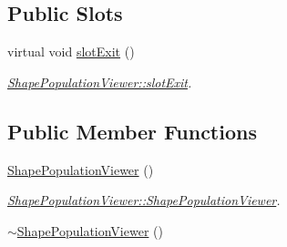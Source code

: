 \subsection*{Public Slots}
\begin{DoxyCompactItemize}
\item 
virtual void \hyperlink{class_shape_population_viewer_a4e328326e343af33bbb6f50368b60fe3}{slot\-Exit} ()
\begin{DoxyCompactList}\small\item\em \hyperlink{class_shape_population_viewer_a4e328326e343af33bbb6f50368b60fe3}{Shape\-Population\-Viewer\-::slot\-Exit}. \end{DoxyCompactList}\end{DoxyCompactItemize}
\subsection*{Public Member Functions}
\begin{DoxyCompactItemize}
\item 
\hyperlink{class_shape_population_viewer_a4f1a26145a1354b29b7b42a02dc8b1cf}{Shape\-Population\-Viewer} ()
\begin{DoxyCompactList}\small\item\em \hyperlink{class_shape_population_viewer_a4f1a26145a1354b29b7b42a02dc8b1cf}{Shape\-Population\-Viewer\-::\-Shape\-Population\-Viewer}. \end{DoxyCompactList}\item 
\hyperlink{class_shape_population_viewer_ae934a47a97a0a578d72ead0b94e4d9aa}{$\sim$\-Shape\-Population\-Viewer} ()
\end{DoxyCompactItemize}
